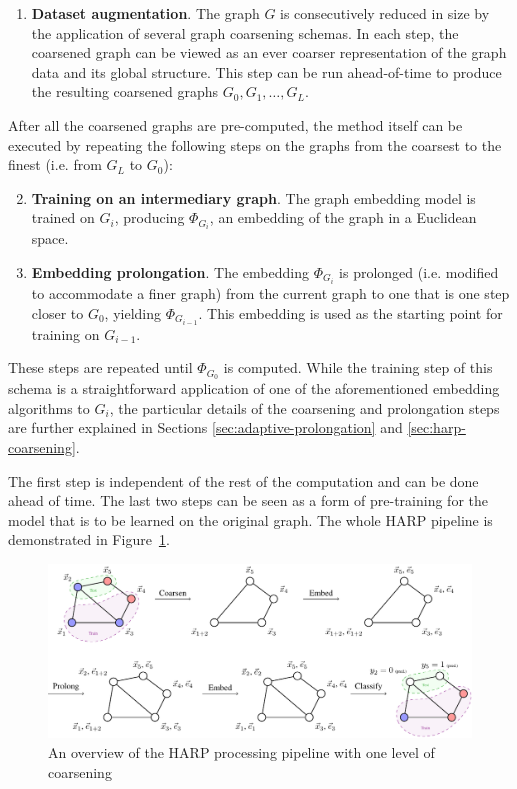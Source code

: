 \begin{enumerate}
  \item \textbf{Dataset augmentation}. The graph \( G \) is consecutively reduced in size by the application of several graph coarsening schemas. In each step, the coarsened graph can be viewed as an ever coarser representation of the graph data and its global structure. This step can be run ahead-of-time to produce the resulting coarsened graphs \( G_0, G_1, \dots, G_L \).
\end{enumerate}
After all the coarsened graphs are pre-computed, the method itself can be executed by repeating the following steps on the graphs from the coarsest to the finest (i.e. from \( G_L \) to \( G_0 \)):
\begin{enumerate}\setcounter{enumi}{1}
  \item \textbf{Training on an intermediary graph}. The graph embedding model is trained on \( G_i \), producing \( \Phi_{G_i} \), an embedding of the graph in a Euclidean space.
  \item \textbf{Embedding prolongation}. The embedding \( \Phi_{G_i} \) is prolonged (i.e. modified to accommodate a finer graph) from the current graph to one that is one step closer to \( G_0 \), yielding \( \Phi_{G_{i - 1}} \). This embedding is used as the starting point for training on \( G_{i - 1} \).
\end{enumerate}
These steps are repeated until \( \Phi_{G_0} \) is computed. While the training step of this schema is a straightforward application of one of the aforementioned embedding algorithms to \( G_i \), the particular details of the coarsening and prolongation steps are further explained in Sections \ref{sec:adaptive-prolongation} and \ref{sec:harp-coarsening}.

The first step is independent of the rest of the computation and can be done ahead of time. The last two steps can be seen as a form of pre-training for the model that is to be learned on the original graph. The whole HARP pipeline is demonstrated in Figure~\ref{fig:harp-overview}.

\begin{figure}
  \centering
  \includegraphics[width=\textwidth]{images/harp-overview/harp-overview.pdf}
  \caption{An overview of the HARP processing pipeline with one level of coarsening}
  \label{fig:harp-overview}
\end{figure}

